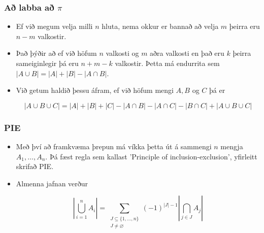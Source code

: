 \documentclass{beamer}
\newcommand\abs[1]{\left|#1\right|}
\begin{document}
\begin{frame}
\frametitle{Að labba að $\pi$}

\begin{itemize}

\item<1-> Ef við megum velja milli $n$ hluta, nema okkur er bannað að velja $m$ þeirra eru $n - m$ valkostir.

\item<2-> Það þýðir að ef við höfum $n$ valkosti og $m$ aðra valkosti en það eru $k$ þeirra sameiginlegir þá eru $n + m - k$ valkostir. Þetta má endurrita sem $\abs{A \cup B} = \abs{A} + \abs{B} - \abs{A \cap B}$.

\item<3-> Við getum haldið þessu áfram, ef við höfum mengi $A, B$ og $C$ þá er 
\begin{small}
\[\abs{A \cup B \cup C} = \abs{A} + \abs{B} + \abs{C} - \abs{A \cap B} - \abs{A \cap C} - \abs{B \cap C} + \abs{A \cup B \cup C}\]
\end{small}

\end{itemize}

\end{frame}

\begin{frame}
\frametitle{PIE}

\begin{itemize}

\item<1-> Með því að framkvæma þrepun má víkka þetta út á sammengi $n$ mengja $A_1,\dots,A_n$. Þá fæst regla sem kallast 'Principle of inclusion-exclusion', yfirleitt skrifað PIE.

\item<2-> Almenna jafnan verður

\[\abs{\bigcup_{i = 1}^n A_i} = \sum_{\substack{J \subseteq \{1,\dots,n\} \\ J \neq \varnothing}} (-1)^{\abs{J} - 1} \abs{\bigcap_{j \in J} A_j}\]

\end{itemize}

\end{frame}
\end{document}
